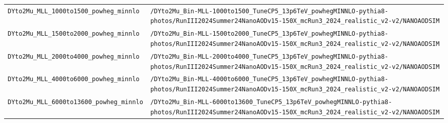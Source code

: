 \begin{longtable}{@{}>{\RaggedRight\arraybackslash}p{} >{\RaggedRight\arraybackslash}p{}@{}}
\addlinespace[2pt]
\texttt{DYto2Mu\_\allowbreak{}MLL\_\allowbreak{}1000to1500\_\allowbreak{}powheg\_\allowbreak{}minnlo} & \texttt{/\allowbreak{}DYto2Mu\_\allowbreak{}Bin-\allowbreak{}MLL-\allowbreak{}1000to1500\_\allowbreak{}TuneCP5\_\allowbreak{}13p6TeV\_\allowbreak{}powhegMINNLO-\allowbreak{}pythia8-\allowbreak{}photos/\allowbreak{}RunIII2024Summer24NanoAODv15-\allowbreak{}150X\_\allowbreak{}mcRun3\_\allowbreak{}2024\_\allowbreak{}realistic\_\allowbreak{}v2-\allowbreak{}v2/\allowbreak{}NANOAODSIM} \\
\addlinespace[2pt]
\texttt{DYto2Mu\_\allowbreak{}MLL\_\allowbreak{}1500to2000\_\allowbreak{}powheg\_\allowbreak{}minnlo} & \texttt{/\allowbreak{}DYto2Mu\_\allowbreak{}Bin-\allowbreak{}MLL-\allowbreak{}1500to2000\_\allowbreak{}TuneCP5\_\allowbreak{}13p6TeV\_\allowbreak{}powhegMINNLO-\allowbreak{}pythia8-\allowbreak{}photos/\allowbreak{}RunIII2024Summer24NanoAODv15-\allowbreak{}150X\_\allowbreak{}mcRun3\_\allowbreak{}2024\_\allowbreak{}realistic\_\allowbreak{}v2-\allowbreak{}v2/\allowbreak{}NANOAODSIM} \\
\addlinespace[2pt]
\texttt{DYto2Mu\_\allowbreak{}MLL\_\allowbreak{}2000to4000\_\allowbreak{}powheg\_\allowbreak{}minnlo} & \texttt{/\allowbreak{}DYto2Mu\_\allowbreak{}Bin-\allowbreak{}MLL-\allowbreak{}2000to4000\_\allowbreak{}TuneCP5\_\allowbreak{}13p6TeV\_\allowbreak{}powhegMINNLO-\allowbreak{}pythia8-\allowbreak{}photos/\allowbreak{}RunIII2024Summer24NanoAODv15-\allowbreak{}150X\_\allowbreak{}mcRun3\_\allowbreak{}2024\_\allowbreak{}realistic\_\allowbreak{}v2-\allowbreak{}v2/\allowbreak{}NANOAODSIM} \\
\addlinespace[2pt]
\texttt{DYto2Mu\_\allowbreak{}MLL\_\allowbreak{}4000to6000\_\allowbreak{}powheg\_\allowbreak{}minnlo} & \texttt{/\allowbreak{}DYto2Mu\_\allowbreak{}Bin-\allowbreak{}MLL-\allowbreak{}4000to6000\_\allowbreak{}TuneCP5\_\allowbreak{}13p6TeV\_\allowbreak{}powhegMINNLO-\allowbreak{}pythia8-\allowbreak{}photos/\allowbreak{}RunIII2024Summer24NanoAODv15-\allowbreak{}150X\_\allowbreak{}mcRun3\_\allowbreak{}2024\_\allowbreak{}realistic\_\allowbreak{}v2-\allowbreak{}v2/\allowbreak{}NANOAODSIM} \\
\addlinespace[2pt]
\texttt{DYto2Mu\_\allowbreak{}MLL\_\allowbreak{}6000to13600\_\allowbreak{}powheg\_\allowbreak{}minnlo} & \texttt{/\allowbreak{}DYto2Mu\_\allowbreak{}Bin-\allowbreak{}MLL-\allowbreak{}6000to13600\_\allowbreak{}TuneCP5\_\allowbreak{}13p6TeV\_\allowbreak{}powhegMINNLO-\allowbreak{}pythia8-\allowbreak{}photos/\allowbreak{}RunIII2024Summer24NanoAODv15-\allowbreak{}150X\_\allowbreak{}mcRun3\_\allowbreak{}2024\_\allowbreak{}realistic\_\allowbreak{}v2-\allowbreak{}v2/\allowbreak{}NANOAODSIM} \\

\end{longtable}
